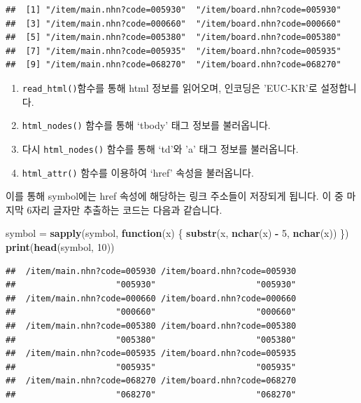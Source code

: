 \documentclass[]{book}
\newenvironment{Shaded}{\begin{snugshade}}{\end{snugshade}}
\newcommand{\ControlFlowTok}[1]{\textcolor[rgb]{0.13,0.29,0.53}{\textbf{#1}}}
\newcommand{\DecValTok}[1]{\textcolor[rgb]{0.00,0.00,0.81}{#1}}
\newcommand{\KeywordTok}[1]{\textcolor[rgb]{0.13,0.29,0.53}{\textbf{#1}}}
\newcommand{\NormalTok}[1]{#1}
\newcommand{\OperatorTok}[1]{\textcolor[rgb]{0.81,0.36,0.00}{\textbf{#1}}}
\newcommand{\StringTok}[1]{\textcolor[rgb]{0.31,0.60,0.02}{#1}}
\providecommand{\tightlist}{%
  \setlength{\itemsep}{0pt}\setlength{\parskip}{0pt}}
\begin{document}
\begin{verbatim}
##  [1] "/item/main.nhn?code=005930"  "/item/board.nhn?code=005930"
##  [3] "/item/main.nhn?code=000660"  "/item/board.nhn?code=000660"
##  [5] "/item/main.nhn?code=005380"  "/item/board.nhn?code=005380"
##  [7] "/item/main.nhn?code=005935"  "/item/board.nhn?code=005935"
##  [9] "/item/main.nhn?code=068270"  "/item/board.nhn?code=068270"
\end{verbatim}

\begin{enumerate}
\def\labelenumi{\arabic{enumi}.}
\tightlist
\item
  \texttt{read\_html()}함수를 통해 html 정보를 읽어오며, 인코딩은 'EUC-KR'로 설정합니다.
\item
  \texttt{html\_nodes()} 함수를 통해 `tbody' 태그 정보를 불러옵니다.
\item
  다시 \texttt{html\_nodes()} 함수를 통해 `td'와 'a' 태그 정보를 불러옵니다.
\item
  \texttt{html\_attr()} 함수를 이용하여 `href' 속성을 불러옵니다.
\end{enumerate}

이를 통해 symbol에는 href 속성에 해당하는 링크 주소들이 저장되게 됩니다. 이 중 마지막 6자리 글자만 추출하는 코드는 다음과 같습니다.

\begin{Shaded}
\begin{Highlighting}[]
\NormalTok{symbol =}\StringTok{ }\KeywordTok{sapply}\NormalTok{(symbol, }\ControlFlowTok{function}\NormalTok{(x) \{}
        \KeywordTok{substr}\NormalTok{(x, }\KeywordTok{nchar}\NormalTok{(x) }\OperatorTok{-}\StringTok{ }\DecValTok{5}\NormalTok{, }\KeywordTok{nchar}\NormalTok{(x)) }
\NormalTok{      \})}
\KeywordTok{print}\NormalTok{(}\KeywordTok{head}\NormalTok{(symbol, }\DecValTok{10}\NormalTok{))}
\end{Highlighting}
\end{Shaded}

\begin{verbatim}
##  /item/main.nhn?code=005930 /item/board.nhn?code=005930 
##                    "005930"                    "005930" 
##  /item/main.nhn?code=000660 /item/board.nhn?code=000660 
##                    "000660"                    "000660" 
##  /item/main.nhn?code=005380 /item/board.nhn?code=005380 
##                    "005380"                    "005380" 
##  /item/main.nhn?code=005935 /item/board.nhn?code=005935 
##                    "005935"                    "005935" 
##  /item/main.nhn?code=068270 /item/board.nhn?code=068270 
##                    "068270"                    "068270"
\end{verbatim}
\end{document}
